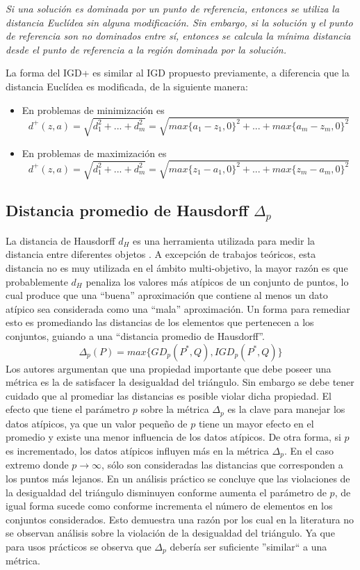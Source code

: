 \textit{Si una solución es dominada por un punto de referencia, entonces se utiliza la distancia Euclídea sin alguna modificación. Sin embargo, si la solución y el punto de referencia son no dominados entre sí, entonces se calcula la mínima distancia desde el punto de referencia a la región dominada por la solución.}
%

La forma del IGD+ es similar al IGD propuesto previamente, a diferencia que la distancia Euclídea es modificada, de la siguiente manera:
\begin{itemize}
\item En problemas de minimización es \[d^+(z,a) = \sqrt{d_1^2 + ... + d_m^2} = \sqrt{max\{a_1 - z_1, 0\}^2+...+max\{a_m - z_m, 0\}^2}   \]
\item En problemas de maximización es \[d^+(z,a) = \sqrt{d_1^2 + ... + d_m^2} = \sqrt{max\{z_1 - a_1, 0\}^2+...+max\{z_m - a_m, 0\}^2}\]
\end{itemize}
%

\subsection{Distancia promedio de Hausdorff $\Delta_p$}
La distancia de Hausdorff $d_H$ es una herramienta utilizada para medir la distancia entre diferentes objetos \cite{Joel:HausdorffDistance}.
%
A excepción de trabajos teóricos, esta distancia no es muy utilizada en el ámbito multi-objetivo, la mayor razón es que probablemente $d_H$ penaliza los valores más atípicos de un conjunto de puntos, lo cual produce que una ``buena'' aproximación que contiene al menos un dato atípico sea considerada como una ``mala'' aproximación.
%
Un forma para remediar esto es promediando las distancias de los elementos que pertenecen a los conjuntos, guiando a una ``distancia promedio de Hausdorff''.
%
\begin{equation}
\Delta_p(P) = max \{ GD_p(P^*, Q), IGD_p(P^*, Q) \}
\end{equation}
%
Los autores \citeauthor{Joel:HausdorffDistance} argumentan que una propiedad importante que debe poseer una métrica es la de satisfacer la desigualdad del triángulo.
%
Sin embargo se debe tener cuidado que al promediar las distancias es posible violar dicha propiedad.
%
El efecto que tiene el parámetro $p$ sobre la métrica $\Delta_p$ es la clave para manejar los datos atípicos, ya que un valor pequeño de $p$ tiene un mayor efecto en el promedio y existe una menor influencia de los datos atípicos.
%
De otra forma, si $p$ es incrementado, los datos atípicos influyen más en la métrica $\Delta_p$.
%
En el caso extremo donde $p \rightarrow \infty$, sólo son consideradas las distancias que corresponden a los puntos más lejanos.
%
En un análisis práctico se concluye que las violaciones de la desigualdad del triángulo disminuyen conforme aumenta el parámetro de $p$, de igual forma sucede como conforme incrementa el número de elementos en los conjuntos considerados.
%
Esto demuestra una razón por los cual en la literatura no se observan análisis sobre la violación de la desigualdad del triángulo.
%
Ya que para usos prácticos se observa que $\Delta_p$ debería ser suficiente ''similar`` a una métrica.


